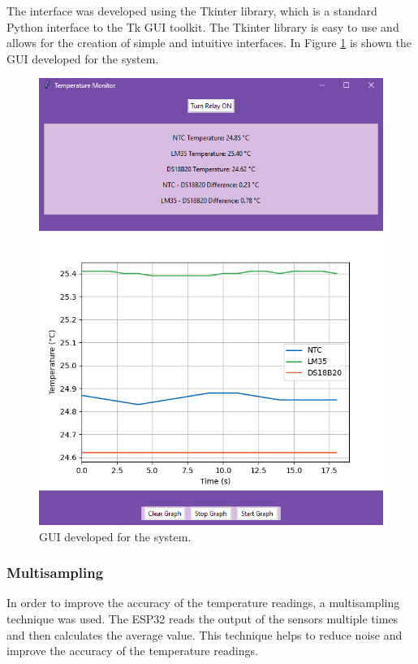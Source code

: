 \documentclass[12pt]{article}
\begin{document}
The interface was developed using the Tkinter library, which is a standard Python interface to the Tk GUI toolkit. The Tkinter library is easy to use and allows for the creation of simple and intuitive interfaces. In Figure \ref{fig:gui} is shown the GUI developed for the system.

\begin{figure}[H] 
    \centering
    \includegraphics*[scale = 0.4]{images/GUI-presentation.png}
    \caption{GUI developed for the system.}
    \label{fig:gui}
\end{figure}

\subsubsection{Multisampling}

In order to improve the accuracy of the temperature readings, a multisampling technique was used. The ESP32 reads the output of the sensors multiple times and then calculates the average value. This technique helps to reduce noise and improve the accuracy of the temperature readings.
\end{document}
